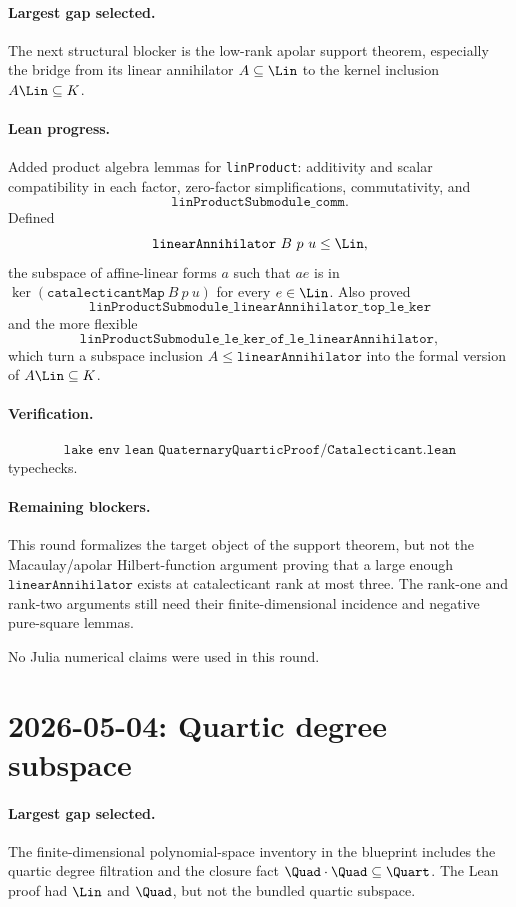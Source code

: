 \documentclass[11pt]{article}
\begin{document}
\paragraph{Largest gap selected.}
The next structural blocker is the low-rank apolar support theorem, especially
the bridge from its linear annihilator \(A\subseteq\Lin\) to the kernel
inclusion \(A\Lin\subseteq K\).

\paragraph{Lean progress.}
Added product algebra lemmas for \texttt{linProduct}: additivity and scalar
compatibility in each factor, zero-factor simplifications, commutativity, and
\[
\texttt{linProductSubmodule\_comm}.
\]
Defined
\[
\texttt{linearAnnihilator}\ B\ p\ u\le\Lin,
\]
the subspace of affine-linear forms \(a\) such that \(ae\) is in
\(\ker(\texttt{catalecticantMap}\ B\ p\ u)\) for every \(e\in\Lin\).
Also proved
\[
\texttt{linProductSubmodule\_linearAnnihilator\_top\_le\_ker}
\]
and the more flexible
\[
\texttt{linProductSubmodule\_le\_ker\_of\_le\_linearAnnihilator},
\]
which turn a subspace inclusion \(A\le\texttt{linearAnnihilator}\) into the
formal version of \(A\Lin\subseteq K\).

\paragraph{Verification.}
\[
\texttt{lake env lean QuaternaryQuarticProof/Catalecticant.lean}
\]
typechecks.

\paragraph{Remaining blockers.}
This round formalizes the target object of the support theorem, but not the
Macaulay/apolar Hilbert-function argument proving that a large enough
\(\texttt{linearAnnihilator}\) exists at catalecticant rank at most three.
The rank-one and rank-two arguments still need their finite-dimensional
incidence and negative pure-square lemmas.

No Julia numerical claims were used in this round.

\section*{2026-05-04: Quartic degree subspace}

\paragraph{Largest gap selected.}
The finite-dimensional polynomial-space inventory in the blueprint includes
the quartic degree filtration and the closure fact
\(\Quad\cdot\Quad\subseteq\Quart\).  The Lean proof had \(\Lin\) and
\(\Quad\), but not the bundled quartic subspace.
\end{document}

